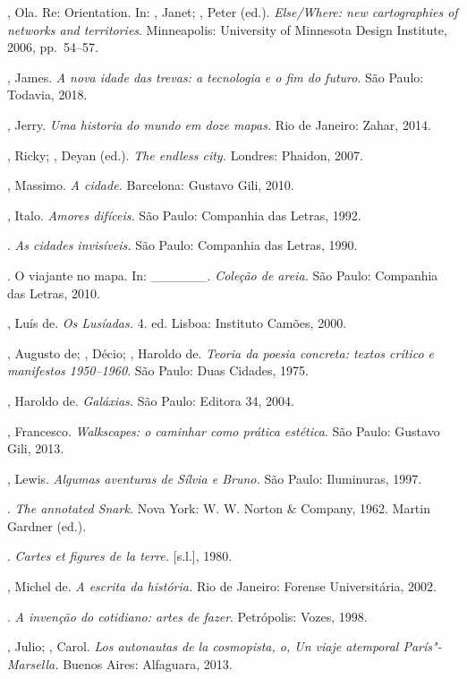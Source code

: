 \begin{bibliohedra}
, Ola. Re: Orientation. In: , Janet; , Peter (ed.). \emph{Else/Where: new cartographies of networks and territories}.
Minneapolis: University of Minnesota Design Institute, 2006, pp.~54--57.

, James. \emph{A nova idade das trevas: a tecnologia e o fim do futuro}. São Paulo: Todavia, 2018.

, Jerry. \emph{Uma historia do mundo em doze mapas.} Rio de
Janeiro: Zahar, 2014.

, Ricky; , Deyan (ed.). \emph{The endless city.} Londres:
Phaidon, 2007.

, Massimo. \emph{A cidade.} Barcelona: Gustavo Gili, 2010.

, Italo. \emph{Amores difíceis.} São Paulo: Companhia das
Letras, 1992.

\tit{\_\_\_\_\_\_}. \emph{As cidades invisíveis.} São Paulo: Companhia
das Letras, 1990.

\tit{\_\_\_\_\_\_}. O viajante no mapa. In: \_\_\_\_\_\_.
\emph{Coleção de areia.} São Paulo: Companhia das Letras, 2010.

, Luís de. \emph{Os Lusíadas.} 4. ed. Lisboa: Instituto Camões,
2000.

, Augusto de; , Décio; , Haroldo de. \emph{Teoria da poesia concreta: textos crítico e manifestos 1950--1960}. São Paulo:
Duas Cidades, 1975.

, Haroldo de. \emph{Galáxias.} São Paulo: Editora 34, 2004.

, Francesco. \emph{Walkscapes: o caminhar como prática
estética}. São Paulo: Gustavo Gili, 2013.

, Lewis. \emph{Algumas aventuras de Sílvia e Bruno.} São Paulo:
Iluminuras, 1997.

\tit{\_\_\_\_\_\_}. \emph{The annotated Snark.} Nova York: W. W. Norton
\& Company, 1962. Martin Gardner (ed.).

. \emph{Cartes et figures de la terre.}
{[}s.l.{]}, 1980.

, Michel de. \emph{A escrita da história.} Rio de Janeiro: Forense Universitária, 2002.

\tit{\_\_\_\_\_\_}. \emph{A invenção do cotidiano: artes de fazer}.
Petrópolis: Vozes, 1998.

, Julio; , Carol. \emph{Los autonautas de la cosmopista,
o, Un viaje atemporal París"-Marsella.} Buenos Aires: Alfaguara, 2013.


\end{bibliohedra}

